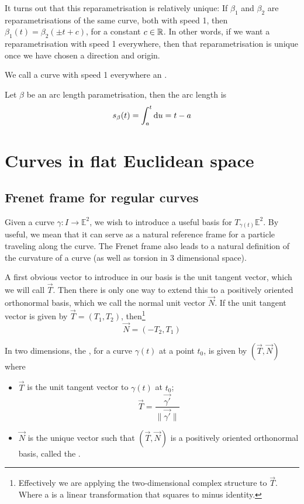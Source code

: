 It turns out that this reparametrisation is relatively unique: If $\beta_1$ and $\beta_2$ are reparametrisations of the same curve, both with speed 1, then $\beta_1(t) = \beta_2(\pm t + c)$, for a constant $c\in\mathbb{R}$. In other words, if we want a reparametrisation with speed 1 everywhere, then that reparametrisation is unique once we have chosen a direction and origin.

\begin{definition}
We call a curve with speed 1 everywhere an .
\end{definition}

Let $\beta$ be an arc length parametrisation, then the arc length is
\[ s_\beta(t) = \int_a^t \operatorname{d \!}{u} = t - a \]

\section{Curves in flat Euclidean space}
\subsection{Frenet frame for regular curves}
Given a curve $\gamma: I \to \mathbb{E}^2$, we wish to introduce a useful basis for $T_{\gamma(t)}\mathbb{E}^2$. By useful, we mean that it can serve as a natural reference frame for a particle traveling along the curve. The Frenet frame also leads to a natural definition of the curvature of a curve (as well as torsion in 3 dimensional space).

A first obvious vector to introduce in our basis is the unit tangent vector, which we will call $\vec{T}$. Then there is only one way to extend this to a positively oriented orthonormal basis, which we call the normal unit vector $\vec{N}$. If the unit tangent vector is given by $\vec{T} = \left(T_1, T_2\right)$, then\footnote{Effectively we are applying the two-dimensional complex structure to $\vec{T}$. Where a  is a linear transformation that squares to minus identity.}
\[ \vec{N} = \left(-T_2, T_1\right) \]
\begin{definition}
In two dimensions, the , for a curve $\gamma(t)$ at a point $t_0$, is given by $(\vec{T}, \vec{N})$ where
\begin{itemize}
\item $\vec{T}$ is the unit tangent vector to $\gamma(t)$ at $t_0$;
\[ \vec{T} = \frac{\vec{\gamma'}}{\lVert \vec{\gamma'} \lVert} \]
\item $\vec{N}$ is the unique vector such that $(\vec{T}, \vec{N})$ is a positively oriented orthonormal basis, called the .
\end{itemize}
\end{definition}

